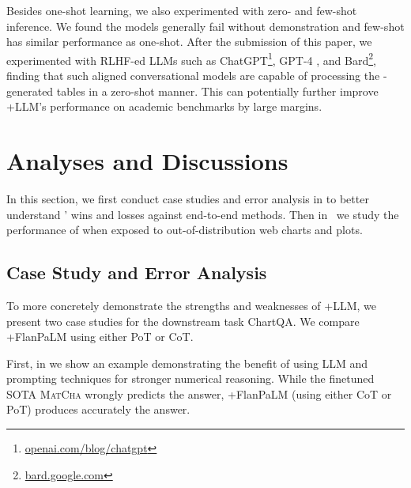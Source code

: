 Besides one-shot learning, we also experimented with zero- and few-shot inference. We found the models generally fail without demonstration and few-shot has similar performance as one-shot. After the submission of this paper, we experimented with RLHF-ed LLMs such as ChatGPT\footnote{\href{https://openai.com/blog/chatgpt}{openai.com/blog/chatgpt}}, GPT-4 \citep{OpenAI2023GPT4TR}, and Bard\footnote{\href{https://bard.google.com/}{bard.google.com}}, finding that such aligned conversational models are capable of processing the \model-generated tables in a zero-shot manner. This can potentially further improve \model+LLM's performance on academic benchmarks by large margins.





\section{Analyses and Discussions}\label{sec:analyses}

In this section, we first conduct case studies and error analysis in  to better understand \model{}' wins and losses against end-to-end methods. Then in~ we study the performance of \model{} when exposed to out-of-distribution web charts and plots.

\subsection{Case Study and Error Analysis}\label{sec:case_study}

To more concretely demonstrate the strengths and weaknesses of \model+LLM, we present two case studies for the downstream task ChartQA. We compare \model+FlanPaLM using either PoT or CoT.

First, in  we show an example demonstrating the benefit of using LLM and prompting techniques for stronger numerical reasoning. While the finetuned SOTA \textsc{MatCha} wrongly predicts the answer, \model+FlanPaLM (using either CoT or PoT) produces accurately the answer.


